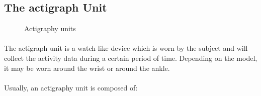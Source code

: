 \documentclass[a4paper,12pt]{article}
\begin{document}
\subsection{The actigraph Unit}

\begin{figure}[H]
\centering
{}
\caption{Actigraphy units}
\end{figure}

\paragraph{}
The actigraph unit is a watch-like device which is worn by the subject and will collect the activity data during a certain period of time. Depending on the model, it may be worn around the wrist or around the ankle.

\paragraph{}
Usually, an actigraphy unit is composed of:
\end{document}
